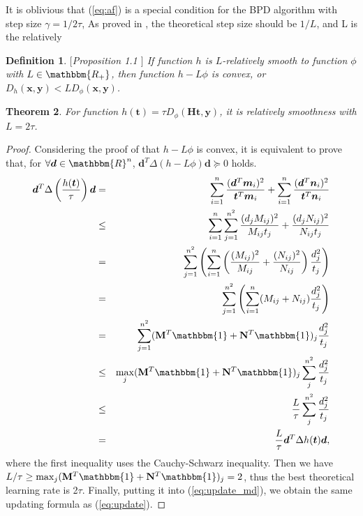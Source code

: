 \documentclass[conference]{IEEEtran}
\newtheorem{thm}{Theorem}
\newtheorem{definition}[thm]{Definition}
\newcommand{\mat}[1]{\mathbf{#1}}
\renewcommand{\vec}[1]{\bm{#1}}
\begin{document}
It is oblivious that (\ref{eq:af}) is a special condition for the BPD algorithm with step size $\gamma = {1}/{2\tau}$,
As proved in \cite{bauschke2017descent}, the theoretical step size should be ${1}/{L}$, and L is the relatively
\begin{definition}$[$Proposition 1.1 \cite{doi:10.1137/16M1099546}$]$
If function $h$ is $L$-relatively smooth to function $\phi$ with $L\in {\mathbbm{R_{+}}}$, then function $h-L\phi$ is convex, or $D_h(\vec x,\vec y)<LD_{\phi}(\vec x,\vec y)$.
\end{definition}


\begin{thm}
For function $h(\vec t) = \tau D_{\phi}(\mat H \vec t, \vec y)$, it is relatively smoothness with $L = 2\tau$.
\end{thm}
\begin{proof}
Considering the proof of that $h-L\phi$ is convex, it is equivalent to prove that, for $\forall \vec d\in{\mathbbm{R}^n}$, $\vec d^{T}\Delta (h-L\phi) \vec d\succeq 0$ holds.
\begin{eqnarray*}
\vec d^{T}\Delta \left(\frac{h(\vec t)}{\tau}\right)\vec d &=& \sum_{i=1}^{n}{\frac{(\vec d^{T}\vec {m}_i)^2}{\vec t^{T} \vec m_i}}+\sum_{i=1}^{n}{\frac{(\vec d^{T}\vec n_i)^2}{\vec t^{T}\vec n_i}}\\
&\leq& \sum_{i=1}^{n}\sum_{j=1}^{n^2}{\frac{(d_j M_{ij})^2}{ M_{ij}t_j}+\frac{(d_j N_{ij})^2}{ N_{ij}t_j}}\\
&=&\sum_{j=1}^{n^2}\left(\sum_{i=1}^{n}\left(\frac{( M_{ij})^2}{ M_{ij}}+\frac{( N_{ij})^2}{ N_{ij}}\right)\frac{d_{j}^{2}}{t_j}\right)\\
&=&\sum_{j=1}^{n^2}\left(\sum_{i=1}^{n}({ M_{ij}}+{ N_{ij}})\frac{d_{j}^{2}}{t_j}\right)\\
&=&\sum_{j=1}^{n^2}({\mat M^{T}\mathbbm{1}}+{\mat N^{T}\mathbbm{1}})_{j}\frac{d_{j}^{2}}{t_j}\\
&\leq& \max_{j} ({\mat M^{T}\mathbbm{1}}+{\mat N^{T}\mathbbm{1}})_{j} \sum_{j}^{n^2}\frac{d_{j}^{2}}{t_j}\\
&\leq& \frac{L}{\tau} \sum_{j}^{n^2}\frac{d_{j}^{2}}{t_j}\\
&=& \frac{L}{\tau} \vec d^{T}\Delta h(\vec t)\vec d,
\end{eqnarray*}
where the first inequality uses the Cauchy-Schwarz inequality.
Then we have $L/\tau \geq \max_{j} ({\mat M^{T}\mathbbm{1}}+{\mat N^{T}\mathbbm{1}})_{j} = 2$, thus the best theoretical learning rate is 2$\tau$. Finally, putting it into (\ref{eq:update_md}), we obtain the same updating formula as (\ref{eq:update}).
\end{proof}
\end{document}
